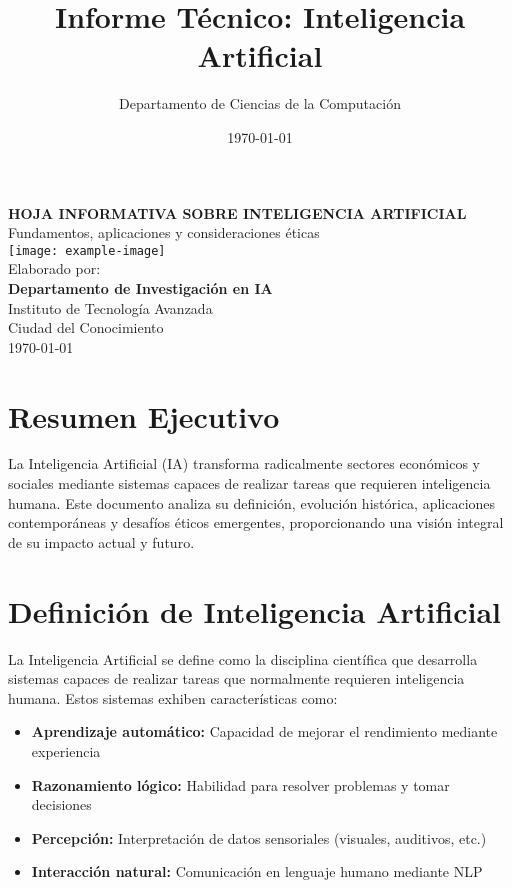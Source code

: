 \documentclass[12pt,a4paper]{article}
\title{Informe Técnico: Inteligencia Artificial}
\author{Departamento de Ciencias de la Computación}
\date{\today}
\begin{document}
\begin{titlepage}
\centering
\vspace*{2cm}
{\LARGE \textbf{HOJA INFORMATIVA SOBRE INTELIGENCIA ARTIFICIAL}}\\[1cm]
{\Large Fundamentos, aplicaciones y consideraciones éticas}\\[2cm]
\texttt{[image: example-image]}\\[1cm]
{\large Elaborado por:}\\[0.5cm]
{\Large \textbf{Departamento de Investigación en IA}}\\[2cm]
{\large Instituto de Tecnología Avanzada}\\[0.5cm]
{\large Ciudad del Conocimiento}\\[2cm]
{\large \today}
\end{titlepage}

\tableofcontents
\newpage

\section*{Resumen Ejecutivo}
La Inteligencia Artificial (IA) transforma radicalmente sectores económicos y sociales mediante sistemas capaces de realizar tareas que requieren inteligencia humana. Este documento analiza su definición, evolución histórica, aplicaciones contemporáneas y desafíos éticos emergentes, proporcionando una visión integral de su impacto actual y futuro.

\section{Definición de Inteligencia Artificial}
La Inteligencia Artificial se define como la disciplina científica que desarrolla sistemas capaces de realizar tareas que normalmente requieren inteligencia humana. Estos sistemas exhiben características como:

\begin{itemize}
\item \textbf{Aprendizaje automático:} Capacidad de mejorar el rendimiento mediante experiencia
\item \textbf{Razonamiento lógico:} Habilidad para resolver problemas y tomar decisiones
\item \textbf{Percepción:} Interpretación de datos sensoriales (visuales, auditivos, etc.)
\item \textbf{Interacción natural:} Comunicación en lenguaje humano mediante NLP
\end{itemize}
\end{document}

